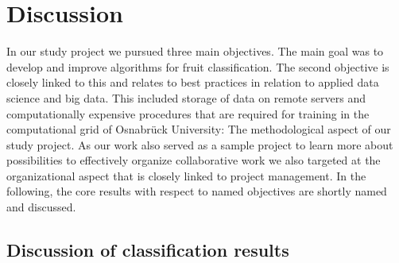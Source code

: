 \section{Discussion}
\label{ch:Discussion}

In our study project we pursued three main objectives. The main goal was to develop and improve algorithms for fruit classification. The second objective is closely linked to this and relates to best practices in relation to applied data science and big data. This included storage of data on remote servers and computationally expensive procedures that are required for training in the computational grid of Osnabrück University: The methodological aspect of our study project. As our work also served as a sample project to learn more about possibilities to effectively organize collaborative work we also targeted at the organizational aspect that is closely linked to project management. In the following, the core results with respect to named objectives are shortly named and discussed.


\subsection{Discussion of classification results}
\label{sec:DiscussionResults}

